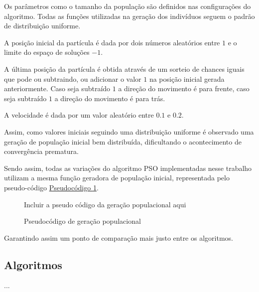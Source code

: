         Os parâmetros como o tamanho da população são definidos nas configurações do algoritmo. Todas as funções utilizadas na geração dos indivíduos seguem o padrão de distribuição uniforme.\hfill\vspace{\onelineskip}
        
        A posição inicial da partícula é dada por dois números aleatórios entre $1$ e o limite do espaço de soluções $- 1$.\hfill\vspace{\onelineskip}
        
        A última posição da partícula é obtida através de um sorteio de chances iguais que pode ou subtraindo, ou adicionar o valor $1$ na posição inicial gerada anteriormente. Caso seja subtraído $1$ a direção do movimento é para frente, caso seja subtraído $1$ a direção do movimento é para trás.\hfill\vspace{\onelineskip}

        A velocidade é dada por um valor aleatório entre $0.1$ e $0.2$.\hfill\vspace{\onelineskip}

        Assim, como valores iniciais seguindo uma distribuição uniforme é observado uma geração de população inicial bem distribuída, dificultando o acontecimento de convergência prematura.
        
        Sendo assim, todas as variações do algoritmo PSO implementadas nesse trabalho utilizam a mesma função geradora de população inicial, representada pelo pseudo-código \hyperref[cod:geracao-pop]{Pseudocódigo \ref{cod:geracao-pop}}.
        
        \begin{figure}[ht]
            \centering
            \small{Incluir a pseudo código da geração populacional aqui}
            \caption{Pseudocódigo de geração populacional}
            \label{cod:geracao-pop}
        \end{figure}
        
        \noindent Garantindo assim um ponto de comparação mais justo entre os algoritmos.



    \subsection{Algoritmos}
            ...

